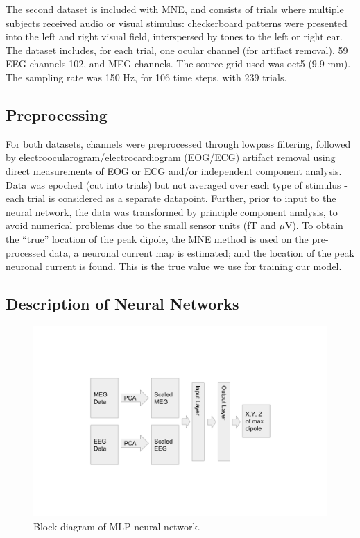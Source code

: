 \documentclass[journal,12pt,onecolumn,draftclsnofoot,]{IEEEtran}
\begin{document}
The second dataset \cite{gramfort2013meg} is included with MNE, and consists of trials where multiple subjects received audio or visual stimulus: checkerboard patterns were presented into the left and right visual field, interspersed by tones to the left or right ear. The dataset includes, for each trial, one ocular channel (for artifact removal), 59 EEG channels 102, and MEG channels. The source grid used was oct5 (9.9 mm). The sampling rate was 150 Hz, for 106 time steps, with 239 trials. 

\subsection{Preprocessing}
For both datasets, channels were preprocessed through lowpass filtering, followed by electroocularogram/electrocardiogram (EOG/ECG) artifact removal using direct measurements of EOG or ECG and/or independent component analysis. Data was epoched (cut into trials) but not averaged over each type of stimulus - each trial is considered as a separate datapoint. Further, prior to input to the neural network, the data was transformed by principle component analysis, to avoid numerical problems due to the small sensor units (fT and $\mu$V). To obtain the ``true'' location of the peak dipole, the MNE method is used on the pre-processed data, a neuronal current map is estimated; and the location of the peak neuronal current is found. This is the true value we use for training our model.

\subsection{Description of Neural Networks} 
\begin{figure}[h!]
\centering
\includegraphics[width=5in]{mlp}
\caption{Block diagram of MLP neural network.}
\label{fig:mlp}
\end{figure}
\end{document}

